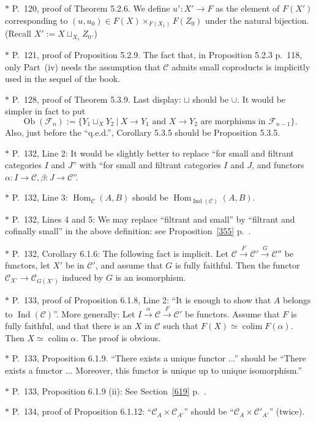 \documentclass[12pt]{article}%
\theoremstyle{remark}
\theoremstyle{definition}
\newcommand{\C}{\mathcal C}
\newcommand{\F}{\mathcal F}
\DeclareMathOperator*{\colim}{colim}
\DeclareMathOperator{\Hom}{Hom}%
\DeclareMathOperator{\Ind}{Ind}
\DeclareMathOperator{\Ob}{Ob}
\begin{document}
\noindent $*$ P.~120, proof of Theorem 5.2.6. We define $u':X'\to F$ as the element of $F(X')$ corresponding to $(u,u_0)\in F(X)\times_{F(X_1)}F(Z_0)$ under the natural bijection. (Recall $X':=X\sqcup_{X_1}Z_0$.)

\noindent $*$ P.~121, proof of Proposition 5.2.9. The fact that, in Proposition 5.2.3 p.~118, only Part~(iv) needs the assumption that $\C$ admits small coproducts is implicitly used in the sequel of the book.

\noindent $*$ P.~128, proof of Theorem 5.3.9. Last display: $\sqcup$ should be $\cup$. It would be simpler in fact to put 
$$
\Ob(\F_n):=\{Y_1\sqcup_XY_2\ |\ X\to Y_1\text{ and }X\to Y_2\text{ are morphisms in }\F_{n-1}\}.
$$ 
Also, just before the ``q.e.d.'', Corollary 5.3.5 should be Proposition 5.3.5.

\noindent $*$ P.~132, Line 2: It would be slightly better to replace ``for small and filtrant categories $I$ and $J$'' with ``for small and filtrant categories $I$ and $J$, and functors $\alpha:I\to\C,\beta:J\to\C$''.

\noindent $*$ P.~132, Line 3: $\Hom_\C(A,B)$ should be $\Hom_{\Ind(\C)}(A,B)$.

\noindent $*$ P.~132, Lines 4 and 5: \guillemotleft We may replace ``filtrant and small'' by ``filtrant and cofinally small'' in the above definition\guillemotright: see Proposition~\ref{355} p.~\pageref{355}.

\noindent $*$ P.~132, Corollary 6.1.6: The following fact is implicit. Let $\C\xrightarrow{F}\C'\xrightarrow{G}\C''$ be functors, let $X'$ be in $\C'$, and assume that $G$ is fully faithful. Then the functor $\C_{X'}\to\C_{G(X')}$ induced by $G$ is an isomorphism.

\noindent $*$ P.~133, proof of Proposition 6.1.8, Line 2: ``It is enough to show that $A$ belongs to $\Ind(\C)$''. More generally: Let $I\xrightarrow{\alpha}\C\xrightarrow{F}\C'$ be functors. Assume that $F$ is fully faithful, and that there is an $X$ in $\C$ such that $F(X)\simeq\colim F(\alpha)$. Then $X\simeq\colim\alpha$. The proof is obvious.

\noindent $*$ P.~133, Proposition 6.1.9. ``There exists a unique functor ...'' should be ``There exists a functor ... Moreover, this functor is unique up to unique isomorphism.''

\noindent $*$ P.~133, Proposition 6.1.9 (ii): See Section~\ref{619} p.~\pageref{619}.

\noindent $*$ P.~134, proof of Proposition 6.1.12: ``$\C_A\times\C_{A'}$'' should be ``$\C_A\times\C'_{A'}$'' (twice).
\end{document}
